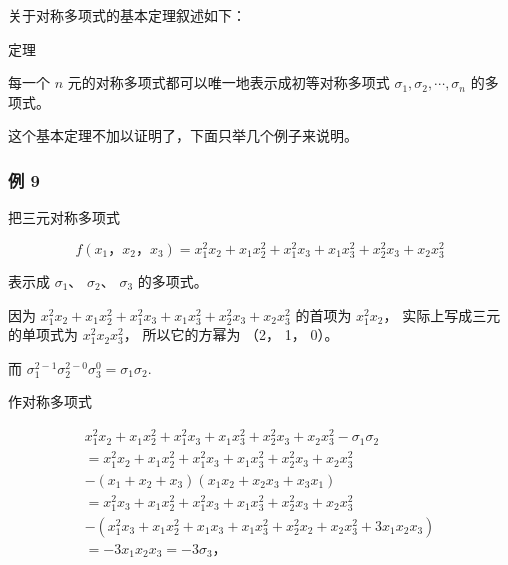 关于对称多项式的基本定理叙述如下：

定理

每一个 \(n\) 元的对称多项式都可以唯一地表示成初等对称多项式
\(\sigma_{1}, \sigma_{2}, \cdots, \sigma_{n}\) 的多项式。

这个基本定理不加以证明了，下面只举几个例子来说明。

\subsubsection{例 9}

把三元对称多项式

\[
f (x _ {1}\text{，} x _ {2}\text{，} x _ {3}) = x _ {1} ^ {2} x _ {2} + x _ {1} x _ {2} ^ {2} + x _ {1} ^ {2} x _ {3} + x _ {1} x _ {3} ^ {2} + x _ {2} ^ {2} x _ {3} + x _ {2} x _ {3} ^ {2}
\]

表示成 \(\sigma_{1}\)、 \(\sigma_{2}\)、 \(\sigma_{3}\) 的多项式。

 因为
\(x_{1}^{2}x_{2} + x_{1}x_{2}^{2} + x_{1}^{2}x_{3} + x_{1}x_{3}^{2} + x_{2}^{2}x_{3} + x_{2}x_{3}^{2}\)
的首项为 \(x_{1}^{2}x_{2}\)， 实际上写成三元的单项式为
\(x_{1}^{2}x_{2}x_{3}^{2}\)， 所以它的方幂为 （2， 1， 0）。

而 \(\sigma_1^{2 - 1}\sigma_2^{2 - 0}\sigma_3^0 = \sigma_1\sigma_2.\)

作对称多项式

\[
\begin{array}{l} x _ {1} ^ {2} x _ {2} + x _ {1} x _ {2} ^ {2} + x _ {1} ^ {2} x _ {3} + x _ {1} x _ {3} ^ {2} + x _ {2} ^ {2} x _ {3} + x _ {2} x _ {3} ^ {2} - \sigma_ {1} \sigma_ {2} \\ = x _ {1} ^ {2} x _ {2} + x _ {1} x _ {2} ^ {2} + x _ {1} ^ {2} x _ {3} + x _ {1} x _ {3} ^ {2} + x _ {2} ^ {2} x _ {3} + x _ {2} x _ {3} ^ {2} \\ - \left(x _ {1} + x _ {2} + x _ {3}\right) \left(x _ {1} x _ {2} + x _ {2} x _ {3} + x _ {3} x _ {1}\right) \\ = x _ {1} ^ {2} x _ {3} + x _ {1} x _ {2} ^ {2} + x _ {1} ^ {2} x _ {3} + x _ {1} x _ {3} ^ {2} + x _ {2} ^ {2} x _ {3} + x _ {2} x _ {3} ^ {2} \\ - \left(x _ {1} ^ {2} x _ {3} + x _ {1} x _ {2} ^ {2} + x _ {1} x _ {3} + x _ {1} x _ {3} ^ {2} + x _ {2} ^ {2} x _ {2} + x _ {2} x _ {3} ^ {2} + 3 x _ {1} x _ {2} x _ {3}\right) \\ = - 3 x _ {1} x _ {2} x _ {3} = - 3 \sigma_ {3}\text{，} \\ \end{array}
\]

